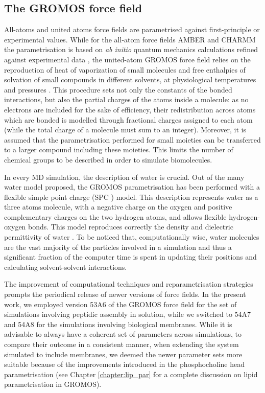 \subsection{The GROMOS force field}
All-atoms and united atoms force fields are parametrised against first-principle or experimental values.
%
While for the all-atom force fields AMBER and CHARMM the parametrisation is based on \emph{ab initio} quantum mechanics calculations refined against experimental data \citep{Maier2015,Dickson2014,Wang2004_amber,MacKerell1998,Klauda2010}, the united-atom GROMOS force field relies on the reproduction of heat of vaporization of small molecules and free enthalpies of solvation of small compounds in different solvents, at physiological temperatures and pressures \citep{Oostenbrink2005,Schmid2011,Reif2013}.
%
This procedure sets not only the constants of the bonded interactions, but also the partial charges of the atoms inside a molecule: as no electrons are included for the sake of efficiency, their redistribution across atoms which are bonded is modelled through fractional charges assigned to each atom (while the total charge of a molecule must sum to an integer).
%
Moreover, it is assumed that the parametrisation performed for small moieties can be transferred to a larger compound including these moieties. This limits the number of chemical groups to be described in order to simulate biomolecules.

In every MD simulation, the description of water is crucial. Out of the many water model proposed, the GROMOS parametrisation has been performed with a flexible simple point charge (SPC \citep{Berendsen1981}) model. This description represents water as a three atoms molecule, with a negative charge on the oxygen and positive complementary charges on the two hydrogen atoms, and allows flexible hydrogen-oxygen bonds. This model reproduces correctly the density and dielectric permittivity of water \cite{Mark2001}. To be noticed that, computationally wise, water molecules are the vast majority of the particles involved in a simulation and thus a significant fraction of the computer time is spent in updating their positions and calculating solvent-solvent interactions.

The improvement of computational techniques and reparametrisation strategies prompts the periodical release of newer versions of force fields. In the present work, we employed version 53A6 of the GROMOS force field \citep{Oostenbrink2004} for the set of simulations involving peptidic assembly in solution, while we switched to 54A7 \citep{Schmid2011} and 54A8 \citep{Reif2013} for the simulations involving biological membranes. While it is advisable to always have a coherent set of parameters across simulations, to compare their outcome in a consistent manner, when extending the system simulated to include membranes, we deemed the newer parameter sets more suitable because of the improvements introduced in the phosphocholine head parametrisation (see Chapter \ref{chapter:lip_par} for a complete discussion on lipid parametrisation in GROMOS).


